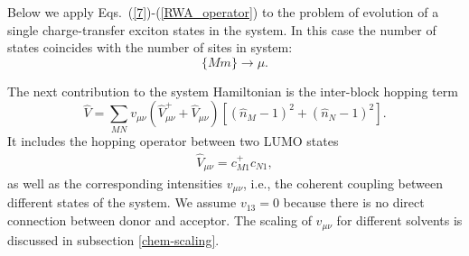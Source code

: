 \documentclass[12pt,twoside,a4paper]{report}
\begin{document}
Below we apply Eqs.~(\ref{7})-(\ref{RWA_operator}) to the problem of evolution of 
a single charge-transfer exciton states in the
system. In this case the number of states coincides with the number of sites in system:
\begin{equation}  \label{mu1_into_mu}
\{M m\} \rightarrow \mu.
\end{equation}



The next contribution to the system Hamiltonian is the
inter-block hopping term 
$$\hat V
        =  \sum_{M{}N}
                 v_{\mu{}\nu}
                 (\hat V^+_{\mu{}\nu} + \hat V_{\mu{}\nu})
                 \left[
                    (\hat n_M{}-1)^2+(\hat n_N -1)^2
                 \right].$$ 
It includes the hopping operator between two LUMO states
\begin{eqnarray}
\hat 
 V
 _{\mu
   \nu} 
         = 
              c^+_{M 1} 
              c  _{N 1},
\label{V=cc}
\end{eqnarray} 
as well as the
corresponding intensities $v_{\mu{}\nu}$, i.e.,  the coherent coupling
between different states of the system.  
We assume $v_{13}=0$ because there is no
direct connection between donor and acceptor.
The scaling of $v_{\mu \nu}$ for different solvents
is discussed in subsection \ref{chem-scaling}.
\end{document}
